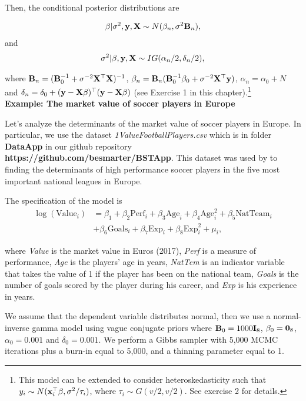 Then, the conditional posterior distributions are

\begin{align*}
	\beta|\sigma^2, {\bf{y}}, {\bf{X}} \sim N(\beta_n, \sigma^2{\bf{B}}_n),
\end{align*}
and
\begin{align*}
	\sigma^2|\beta, {\bf{y}}, {\bf{X}} \sim IG(\alpha_n/2, \delta_n/2),
\end{align*}

 where ${\bf{B}}_n = ({\bf{B}}_0^{-1} + \sigma^{-2} {\bf{X}}^{\top}{\bf{X}})^{-1}$, $\beta_n= {\bf{B}}_n({\bf{B}}_0^{-1}\beta_0 + \sigma^{-2} {\bf{X}}^{\top}{\bf{y}})$, $\alpha_n = \alpha_0 + N$ and $\delta_n = \delta_0 + ({\bf{y}}-{\bf{X}}\beta)^{\top}({\bf{y}}-{\bf{X}}\beta)$ (see Exercise 1 in this chapter).\footnote{This model can be extended to consider heteroskedasticity such that $y_i\sim N({\bf{x}}_i^{\top}\beta, \sigma^2/\tau_i)$, where $\tau_i\sim G(v/2,v/2)$. See exercise 2 for details.}\\

\textbf{Example: The market value of soccer players in Europe}

Let's analyze the determinants of the market value of soccer players in Europe. In particular, we use the dataset \textit{1ValueFootballPlayers.csv} which is in folder \textbf{DataApp} in our github repository \textbf{https://github.com/besmarter/BSTApp}. This dataset was used by \cite{Serna2018} to finding the determinants of high performance soccer players in the five most important national leagues in Europe.

The specification of the model is
\begin{align*}
	\log(\text{Value}_i)&=\beta_1+\beta_2\text{Perf}_i+\beta_3\text{Age}_i+\beta_4\text{Age}^2_i+\beta_5\text{NatTeam}_i\\
	&+\beta_6\text{Goals}_i+\beta_7\text{Exp}_i+\beta_{8}\text{Exp}^2_i+\mu_i,
\end{align*}

where \textit{Value} is the market value in Euros (2017), \textit{Perf} is a measure of performance, \textit{Age} is the players' age in years, \textit{NatTem} is an indicator variable that takes the value of 1 if the player has been on the national team, \textit{Goals} is the number of goals scored by the player during his career, and \textit{Exp} is his experience in years.  

We assume that the dependent variable distributes normal, then we use a normal-inverse gamma model using vague conjugate priors where ${\bf{B}}_0=1000{\bf{I}}_{8}$, $\beta_0={\bf{0}}_{8}$, $\alpha_0=0.001$ and $\delta_0=0.001$. We perform a Gibbs sampler with 5,000 MCMC iterations plus a burn-in equal to 5,000, and a thinning parameter equal to 1.

